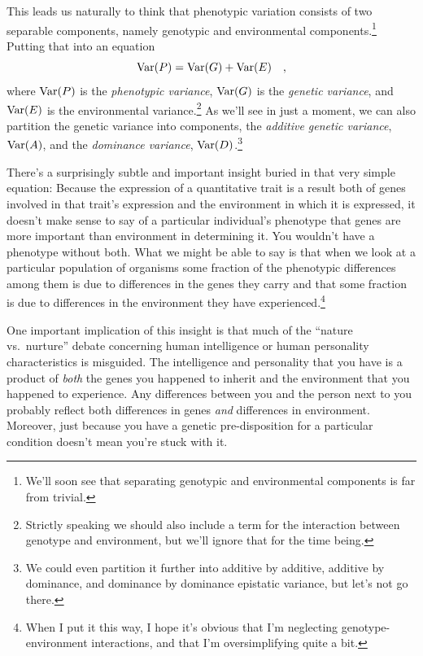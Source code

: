 \documentclass[12pt]{article}
\begin{document}
\noindent This leads us naturally to think that phenotypic variation
consists of two separable components, namely genotypic and
environmental components.\footnote{We'll soon see that separating
genotypic and environmental components is far from trivial.} Putting
that into an equation
\[
\mbox{Var}(P) = \mbox{Var}(G) + \mbox{Var}(E) \quad , 
\]
where $\mbox{Var}(P)$ is the {\it phenotypic variance}, $\mbox{Var}(G)$ is the
{\it genetic variance}, and $\mbox{Var}(E)$ is the environmental
variance.\footnote{Strictly speaking we should also include a term for
the interaction between genotype and environment, but we'll ignore
that for the time being.} As we'll see in just a moment, we can also
partition the genetic variance into components, the {\it additive
genetic variance\/}, $\mbox{Var}(A)$, and the {\it dominance variance},
$\mbox{Var}(D)$.\footnote{We could even partition it further into additive
  by additive, additive by dominance, and dominance by dominance
  epistatic variance, but let's not go there.}  

There's a surprisingly subtle and important insight buried in that
very simple equation: Because the expression of a quantitative trait
is a result both of genes involved in that trait's expression and the
environment in which it is expressed, it doesn't make sense to say of
a particular individual's phenotype that genes are more important than
environment in determining it. You wouldn't have a phenotype without
both. What we might be able to say is that when we look at a
particular population of organisms some fraction of the phenotypic
differences among them is due to differences in the genes they carry
and that some fraction is due to differences in the environment they
have experienced.\footnote{When I put it this way, I hope it's obvious
  that I'm neglecting genotype-environment interactions, and that I'm
  oversimplifying quite a bit.} 

One important implication of this insight is that much of the ``nature
vs.\ nurture'' debate concerning human intelligence or human
personality characteristics is misguided. The intelligence and
personality that you have is a product of {\it both} the genes you
happened to inherit and the environment that you happened to
experience. Any differences between you and the person next to you
probably reflect both differences in genes {\it and\/} differences in
environment. Moreover, just because you have a genetic pre-disposition
for a particular condition doesn't mean you're stuck with it.
\end{document}
